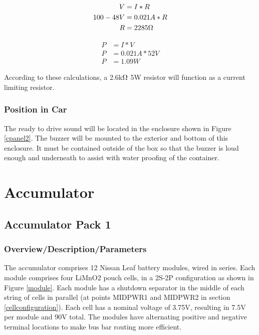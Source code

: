 \documentclass{article}
\begin{document}
            \begin{align}
                V &= I * R\\
                100-48 V &= 0.021A * R\\
                R &= 2285 \ohm
            \end{align}
            
            \begin{align}
                P &= I * V \\
                P &= 0.021A * 52 V \\
                P &= 1.09W
            \end{align}
            
            According to these calculations, a 2.6k$\ohm$ 5W resistor will function as a current limiting resistor. 

        \subsubsection{Position in Car}

            The ready to drive sound will be located in the enclosure shown in Figure \ref{cpanel2}. The buzzer will be mounted to the exterior and bottom of this enclosure. It must be contained outside of the box so that the buzzer is loud enough and underneath to assist with water proofing of the container.

\newpage

\section{Accumulator}

    \subsection{Accumulator Pack 1} \label{Battery1}

        \subsubsection{Overview/Description/Parameters} \label{batteryoverview}

            
            The accumulator comprises 12 Nissan Leaf battery modules, wired in series. Each module comprises four LiMnO2 pouch cells, in a 2S-2P configuration as shown in Figure \ref{module}. Each module has a shutdown separator in the middle of each string of cells in parallel (at points MIDPWR1 and MIDPWR2 in section \ref{cellconfiguration}). Each cell has a nominal voltage of 3.75V, resulting in 7.5V per module and 90V total. The modules have alternating positive and negative terminal locations to make bus bar routing more efficient.
            
\end{document}
